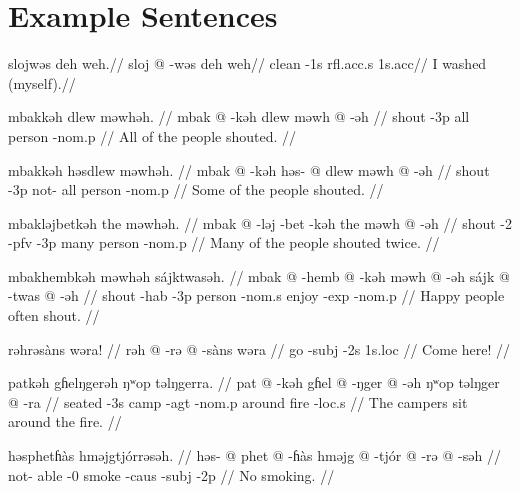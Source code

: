 \section{Example Sentences}

\ex
\begingl
\glpreamble slojwəs deh weh.//
\gla sloj @ -wəs deh weh//
\glb clean -1s {\sc rfl}.{\sc acc}.s 1s.{\sc acc}//
\glft I washed (myself).//
\endgl
\xe

\pex
\a
\begingl
\glpreamble mbakkəh dlew məwhəh. //
\gla mbak @ -kəh dlew məwh @ -əh //
\glb shout -3p all person -{\sc nom}.p //
\glft All of the people shouted. //
\endgl

\a
\begingl
\glpreamble mbakkəh həsdlew məwhəh. //
\gla mbak @ -kəh həs- @ dlew məwh @ -əh //
\glb shout -3p not- all person -{\sc nom}.p //
\glft Some of the people shouted. //
\endgl

\a
\begingl
\glpreamble mbakləjbetkəh the məwhəh. //
\gla mbak @ -ləj -bet -kəh the məwh @ -əh //
\glb shout -2 -{\sc pfv} -3p many person -{\sc nom}.p //
\glft Many of the people shouted twice. //
\endgl

\a
\begingl
\glpreamble mbakhembkəh məwhəh sájktwasəh. //
\gla mbak @ -hemb @ -kəh məwh @ -əh sájk  @ -twas @ -əh //
\glb shout -{\sc hab} -3p person -{\sc nom}.s enjoy -{\sc exp} -{\sc nom}.p //
\glft Happy people often shout. //
\endgl
\xe

\ex
\begingl
\glpreamble rəhrəsàns wəra! //
\gla rəh @ -rə @ -sàns wəra //
\glb go -{\sc subj} -2s 1s.{\sc loc} //
\glft Come here! //
\endgl
\xe

\ex
\begingl
\glpreamble patkəh gɦelŋgerəh ŋʷop təlŋgerra. //
\gla pat @ -kəh gɦel @ -ŋger @ -əh ŋʷop təlŋger @ -ra //
\glb seated -3s camp -{\sc agt} -{\sc nom}.p around fire -{\sc loc}.s //
\glft The campers sit around the fire. //
\endgl
\xe

\ex
\begingl
\glpreamble həsphetɦàs hməjgtjórrəsəh. //
\gla həs- @ phet @ -ɦàs hməjg @ -tjór @ -rə @ -səh //
\glb not- able -0 smoke -{\sc caus} -{\sc subj} -2p //
\glft No smoking. //
\endgl
\xe
